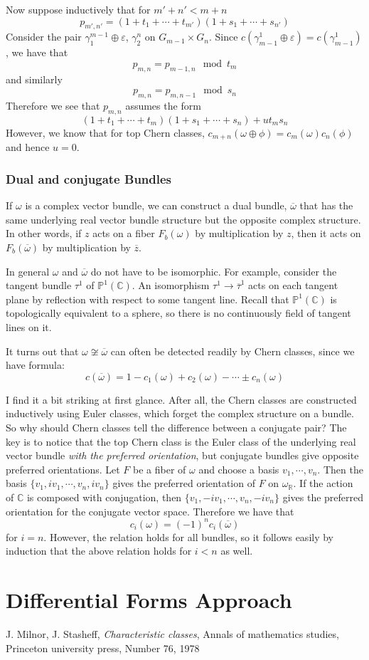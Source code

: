 \documentclass[12pt]{article}
\theoremstyle{plain}
\theoremstyle{definition}
\newcommand{\IC}{\mathbb{C}}
\newcommand{\IP}{\mathbb{P}}
\newcommand{\IR}{\mathbb{R}}
\newcommand{\<}{\langle}
\renewcommand{\>}{\rangle}
\newcommand{\w}{\omega}
\newcommand{\wb}{\overline}
\newcommand{\sm}{\varepsilon}
\begin{document}
Now suppose inductively that for $m' + n' < m + n$
$$ p_{m', n'} = (1 + t_1 + \cdots + t_{m'})(1 + s_1 + \cdots + s_{n'}) $$
Consider the pair $\gamma_1^{m -1} \oplus \sm$, $\gamma_2^n$ on $G_{m - 1} \times G_n$. Since $c(\gamma^1_{m-1} \oplus \sm) = c(\gamma^1_{m-1})$, we have that 
$$ p_{m, n} = p_{m-1, n} \mod t_m $$
and similarly 
$$ p_{m, n} = p_{m, n -1} \mod s_n $$
Therefore we see that $p_{m, n}$ assumes the form 
$$ (1 + t_1 + \cdots + t_m)(1 + s_1 + \cdots + s_n) + ut_m s_n $$
However, we know that for top Chern classes, $c_{m + n}(\w  \oplus \phi) = c_m(\w)c_n(\phi)$ and hence $u = 0$. 

\subsubsection{Dual and conjugate Bundles}
If $\w$ is a complex vector bundle, we can construct a dual bundle, $\wb{\w}$ that has the same underlying real vector bundle structure but the opposite complex structure. In other words, if $z$ acts on a fiber $F_b(\w)$ by multiplication by $z$, then it acts on $F_b(\wb{\w})$ by multiplication by $\wb{z}$. 

In general $\w$ and $\wb{\w}$ do not have to be isomorphic. For example, consider the tangent bundle $\tau^1$ of $\IP^1(\IC)$. An isomorphism $\tau^1 \to \wb{\tau}^1$ acts on each tangent plane by reflection with respect to some tangent line. Recall that $\IP^1(\IC)$ is topologically equivalent to a sphere, so there is no continuously field of tangent lines on it. 

It turns out that $\w \not\cong \wb{\w}$ can often be detected readily by Chern classes, since we have formula:
$$ c(\wb{\w}) = 1 - c_1(\w) + c_2(\w) - \cdots \pm c_n(\w) $$

I find it a bit striking at first glance. After all, the Chern classes are constructed inductively using Euler classes, which forget the complex structure on a bundle. So why should Chern classes tell the difference between a conjugate pair? The key is to notice that the top Chern class is the Euler class of the underlying real vector bundle \textit{with the preferred orientation}, but conjugate bundles give opposite preferred orientations. Let $F$ be a fiber of $\w$ and choose a basis $v_1, \cdots, v_n$. Then the basis $\{v_1, iv_1, \cdots, v_n, iv_n\}$ gives the preferred orientation of $F$ on $\w_\IR$. If the action of $\IC$ is composed with conjugation, then $\{v_1, -iv_1, \cdots, v_n, -iv_n\}$ gives the preferred orientation for the conjugate vector space. Therefore we have that $$c_i(\w) = (-1)^n c_i(\wb{\w})$$ for $i = n$. However, the relation holds for all bundles, so it follows easily by induction that the above relation holds for $i < n$ as well. 


\section{Differential Forms Approach}

\begin{thebibliography}{9}


  J. Milnor, J. Stasheff, \textit{Characteristic classes}, Annals of mathematics studies, Princeton university press, Number 76, 1978
\end{thebibliography}
\end{document}
